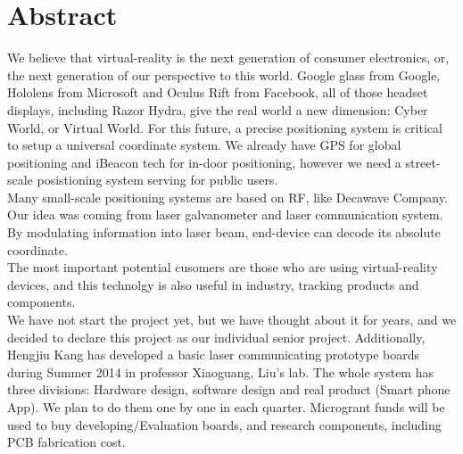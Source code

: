 \documentclass[11pt,a4paper,sans]{moderncv}        %
\begin{document}
\section{Abstract}
We believe that virtual-reality is the next generation of consumer electronics, or, the next generation of our perspective to this world. Google glass from Google, Hololens from Microsoft and Oculus Rift from Facebook, all of those headset displays, including Razor Hydra, give the real world a new dimension: Cyber World, or Virtual World. For this future, a precise positioning system is critical to setup a universal coordinate system. We already have GPS for global positioning and iBeacon tech for in-door positioning, however we need a street-scale posistioning system serving for public users. \\
Many small-scale positioning systems are based on RF, like Decawave Company. Our idea was coming from laser galvanometer and laser communication system. By modulating information into laser beam, end-device can decode its absolute coordinate. \\
The most important potential cusomers are those who are using virtual-reality devices, and this technolgy is also useful in industry, tracking products and components. \\
We have not start the project yet, but we have thought about it for years, and we decided to declare this project as our individual senior project. Additionally, Hengjiu Kang has developed a basic laser communicating prototype boards during Summer 2014 in professor Xiaoguang, Liu's lab.
The whole system has three divisions: Hardware design, software design and real product (Smart phone App). We plan to do them one by one in each quarter. 
Microgrant funds will be used to buy developing/Evaluation boards, and research components, including PCB fabrication cost. 


\makeletterclosing
\end{document}
